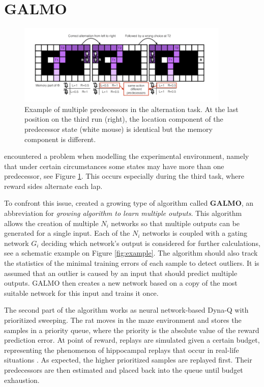 \documentclass[a4paper]{article}
\begin{document}
	\section{GALMO}
	\begin{figure}[b]
		\centering
		\includegraphics[angle=0,width=0.9\textwidth]{./figs/MultiplePredecessors.png}
		\caption{\label{fig:predecessors}Example of multiple predecessors in the alternation task. At the last position on the third run (right), the location component of the predecessor state (white mouse) is identical but the memory component is different. \citep{NeuralDynaQ}}
	\end{figure}
	\label{sec:galmo}
	\citet{NeuralDynaQ} encountered a problem when modelling the experimental environment, namely that under certain circumstances some states may have more than one predecessor, see Figure \ref{fig:predecessors}. This occurs especially during the third task, where reward sides alternate each lap.
	\par To confront this issue, \citet{NeuralDynaQ} created a growing type of algorithm called \textbf{GALMO}, an abbreviation for \textit{growing algorithm to learn multiple outputs}. This algorithm allows the creation of multiple $N_i$ networks so that multiple outputs can be generated for a single input. Each of the $N_i$ networks is coupled with a gating network $G_i$ deciding which network's output is considered for further calculations, see a schematic example on Figure \ref{fig:example}. The algorithm should also track the statistics of the minimal training errors of each sample to detect outliers. It is assumed that an outlier is caused by an input that should predict multiple outputs. GALMO then creates a new network based on a copy of the most suitable network for this input and trains it once. 
	\par The second part of the algorithm works as neural network-based Dyna-Q with prioritized sweeping. The rat moves in the maze environment and stores the samples in a priority queue, where the priority is the absolute value of the reward prediction error. At point of reward, replays are simulated given a certain budget, representing the phenomenon of hippocampal replays that occur in real-life situations \citep{OKEEFE1971171}. As expected, the higher prioritized samples are replayed first. Their predecessors are then estimated and placed back into the queue until budget exhaustion.
\end{document}
